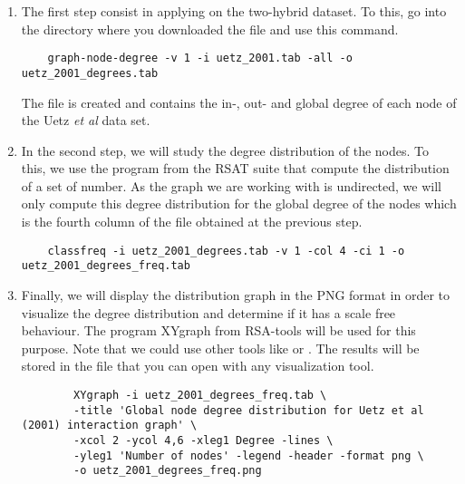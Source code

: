 \begin{enumerate}

\item The first step consist in applying  on the two-hybrid dataset. To this, go into the
directory where you downloaded the file  and use this command.
	
	{\color{Blue} \begin{footnotesize} 
		\begin{verbatim}
	graph-node-degree -v 1 -i uetz_2001.tab -all -o uetz_2001_degrees.tab
		\end{verbatim} \end{footnotesize}
	}		
The file  is created and contains the in-, out- and global degree of each node of the Uetz \textit{et al} data set.

\item In the second step, we will study the degree distribution of the nodes. To this, we use the program  from the RSAT suite that compute the distribution of a set of number. As the graph we are working with is undirected, we will only compute this degree distribution for the global degree of the nodes which is the fourth column of the file  obtained at the previous step.
	
	{\color{Blue} \begin{footnotesize} 
		\begin{verbatim}
	classfreq -i uetz_2001_degrees.tab -v 1 -col 4 -ci 1 -o uetz_2001_degrees_freq.tab
		\end{verbatim} \end{footnotesize}
	}		

\item Finally, we will display the distribution graph in the PNG format in order to visualize the degree distribution and determine if it has a scale free behaviour. The program XYgraph from RSA-tools will be used for this purpose. Note that we could use other tools like  or . The results will be stored in the file  that you can open with any visualization tool.

	{\color{Blue} \begin{footnotesize} 
		\begin{verbatim}
		XYgraph -i uetz_2001_degrees_freq.tab \
		-title 'Global node degree distribution for Uetz et al (2001) interaction graph' \
		-xcol 2 -ycol 4,6 -xleg1 Degree -lines \
		-yleg1 'Number of nodes' -legend -header -format png \
		-o uetz_2001_degrees_freq.png
		\end{verbatim} 
\end{footnotesize}
	}
\end{enumerate}

